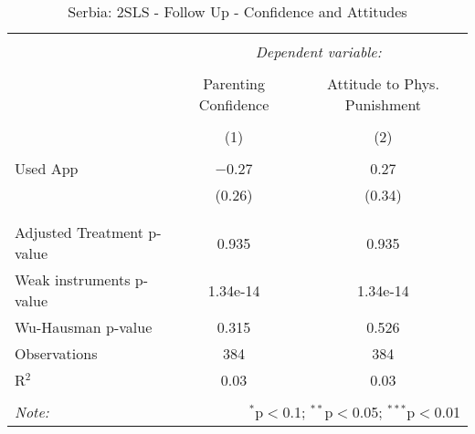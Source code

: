 
\begin{table}[!htbp] \centering 
  \caption{Serbia: 2SLS - Follow Up - Confidence and Attitudes} 
  \label{tbl:Serbia: 2SLS - Follow Up - Confidence and Attitudes} 
\begin{tabular}{@{\extracolsep{5pt}}lcc} 
\\[-1.8ex]\hline 
\hline \\[-1.8ex] 
 & \multicolumn{2}{c}{\textit{Dependent variable:}} \\ 
\cline{2-3} 
\\[-1.8ex] & Parenting Confidence & Attitude to Phys. Punishment \\ 
\\[-1.8ex] & (1) & (2)\\ 
\hline \\[-1.8ex] 
 Used App & $-$0.27 & 0.27 \\ 
  & (0.26) & (0.34) \\ 
  & & \\ 
\hline \\[-1.8ex] 
Adjusted Treatment p-value & 0.935 & 0.935 \\ 
Weak instruments p-value & 1.34e-14 & 1.34e-14 \\ 
Wu-Hausman p-value & 0.315 & 0.526 \\ 
Observations & 384 & 384 \\ 
R$^{2}$ & 0.03 & 0.03 \\ 
\hline 
\hline \\[-1.8ex] 
\textit{Note:}  & \multicolumn{2}{r}{$^{*}$p$<$0.1; $^{**}$p$<$0.05; $^{***}$p$<$0.01} \\ 
\end{tabular} 
\end{table} 
